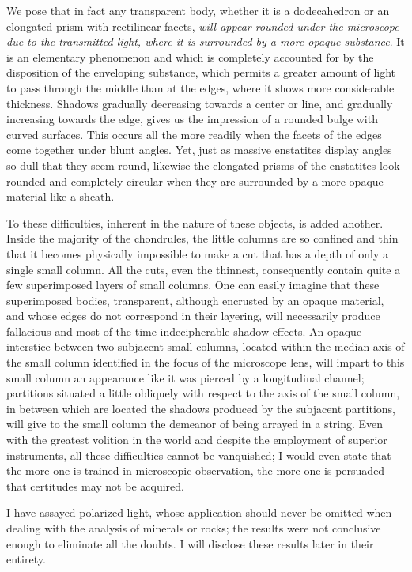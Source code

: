 \documentclass[a4paper, 12pt, oneside]{article}
\begin{document}
We pose that in fact any transparent body, whether it is a dodecahedron or an elongated prism with rectilinear facets, \emph{will appear rounded under the microscope due to the transmitted light, where it is surrounded by a more opaque substance}. It is an elementary phenomenon and which is completely accounted for by the disposition of the enveloping substance, which permits a greater amount of light to pass through the middle than at the edges, where it shows more considerable thickness. Shadows gradually decreasing towards a center or line, and gradually increasing towards the edge, gives us the impression of a rounded bulge with curved surfaces. This occurs all the more readily when the facets of the edges come together under blunt angles. Yet, just as massive enstatites display angles so dull that they seem round, likewise the elongated prisms of the enstatites look rounded and completely circular when they are surrounded by a more opaque material like a sheath.

To these difficulties, inherent in the nature of these objects, is added another. Inside the majority of the chondrules, the little columns are so confined and thin that it becomes physically impossible to make a cut that has a depth of only a single small column. All the cuts, even the thinnest, consequently contain quite a few superimposed layers of small columns. One can easily imagine that these superimposed bodies, transparent, although encrusted by an opaque material, and whose edges do not correspond in their layering, will necessarily produce fallacious and most of the time indecipherable shadow effects. An opaque interstice between two subjacent small columns, located within the median axis of the small column identified in the focus of the microscope lens, will impart to this small column an appearance like it was pierced by a longitudinal channel; partitions situated a little obliquely with respect to the axis of the small column, in between which are located the shadows produced by the subjacent partitions, will give to the small column the demeanor of being arrayed in a string. Even with the greatest volition in the world and despite the employment of superior instruments, all these difficulties cannot be vanquished; I would even state that the more one is trained in microscopic observation, the more one is persuaded that certitudes may not be acquired.

I have assayed polarized light, whose application should never be omitted when dealing with the analysis of minerals or rocks; the results were not conclusive enough to eliminate all the doubts. I will disclose these results later in their entirety.
\end{document}
